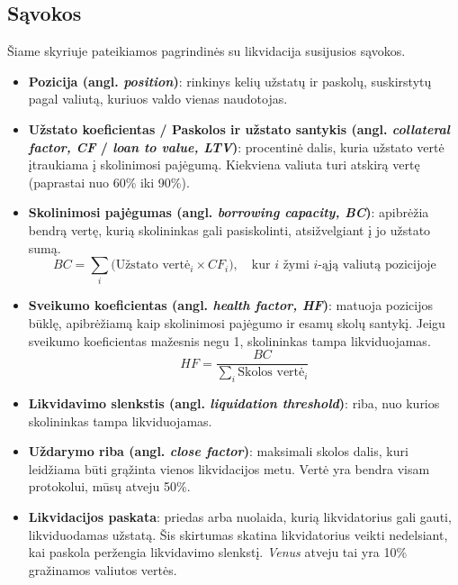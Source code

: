 \documentclass[]{VUMIFTemplateClass}
\begin{document}
\subsection{Sąvokos}
Šiame skyriuje pateikiamos pagrindinės su likvidacija susijusios sąvokos. \cite{venussavokosbendras, aavelikvidacijos}
\begin{itemize}
  \item \textbf{Pozicija (angl. \textit{position})}: rinkinys kelių užstatų ir paskolų, suskirstytų pagal valiutą, kuriuos valdo vienas naudotojas.
  \item \textbf{Užstato koeficientas / Paskolos ir užstato santykis (angl. \textit{collateral factor, CF} / \textit{loan to value, LTV})}: procentinė dalis, kuria užstato vertė įtraukiama į skolinimosi pajėgumą. Kiekviena valiuta turi atskirą vertę (paprastai nuo 60\% iki 90\%).
  \item \textbf{Skolinimosi pajėgumas (angl. \textit{borrowing capacity, BC})}: apibrėžia bendrą vertę, kurią skolininkas gali pasiskolinti, atsižvelgiant į jo užstato sumą.
    \begin{equation}
        BC = \sum_{i} \bigl(\text{Užstato vertė}_{i} \times CF_{i}\bigr), \quad \text{kur } i \text{ žymi } i\text{-ąją valiutą pozicijoje}
        \label{eq:borrowing_capacity}
    \end{equation}
  \item \textbf{Sveikumo koeficientas (angl. \textit{health factor, HF})}: matuoja pozicijos būklę, apibrėžiamą kaip skolinimosi pajėgumo ir esamų skolų santykį. Jeigu sveikumo koeficientas mažesnis negu 1, skolininkas tampa likviduojamas.
    \begin{equation}
        HF = \frac{BC}{\sum_{i} \text{Skolos vertė}_{i}}
        \label{eq:health_factor}
    \end{equation}
  \item \textbf{Likvidavimo slenkstis (angl. \textit{liquidation threshold})}: riba, nuo kurios skolininkas tampa likviduojamas.
  \item \textbf{Uždarymo riba (angl. \textit{close factor})}: maksimali skolos dalis, kuri leidžiama būti grąžinta vienos likvidacijos metu. Vertė yra bendra visam protokolui, mūsų atveju 50\%.
  \item \textbf{Likvidacijos paskata}: priedas arba nuolaida, kurią likvidatorius gali gauti, likviduodamas užstatą.
  Šis skirtumas skatina likvidatorius veikti nedelsiant, kai paskola peržengia likvidavimo slenkstį. \textit{Venus} atveju tai yra 10\% gražinamos valiutos vertės.
\end{itemize}
\end{document}
